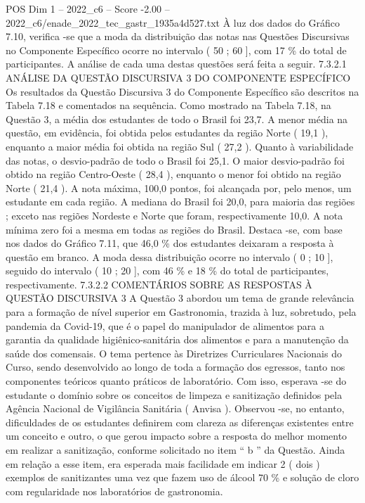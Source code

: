 \begin{textsample}{POS Dim 1 – 2022\_c6 – Score -2.00 – 2022\_c6/enade\_2022\_tec\_gastr\_1935a4d527.txt}
À luz dos dados do Gráfico 7.10, verifica -se que a moda da distribuição das notas nas Questões Discursivas no Componente Específico ocorre no intervalo ( 50 ; 60 ], com 17 \% do total de participantes.
A análise de cada uma destas questões será feita a seguir. 7.3.2.1 ANÁLISE DA QUESTÃO DISCURSIVA 3 DO COMPONENTE ESPECÍFICO Os resultados da Questão Discursiva 3 do Componente Específico são descritos na Tabela 7.18 e comentados na sequência.
Como mostrado na Tabela 7.18, na Questão 3, a média dos estudantes de todo o Brasil foi 23,7.
A menor média na questão, em evidência, foi obtida pelos estudantes da região Norte ( 19,1 ), enquanto a maior média foi obtida na região Sul ( 27,2 ).
Quanto à variabilidade das notas, o desvio-padrão de todo o Brasil foi 25,1.
O maior desvio-padrão foi obtido na região Centro-Oeste ( 28,4 ), enquanto o menor foi obtido na região Norte ( 21,4 ).
A nota máxima, 100,0 pontos, foi alcançada por, pelo menos, um estudante em cada região.
A mediana do Brasil foi 20,0, para maioria das regiões ; exceto nas regiões Nordeste e Norte que foram, respectivamente 10,0.
A nota mínima zero foi a mesma em todas as regiões do Brasil.
Destaca -se, com base nos dados do Gráfico 7.11, que 46,0 \% dos estudantes deixaram a resposta à questão em branco.
A moda dessa distribuição ocorre no intervalo ( 0 ; 10 ], seguido do intervalo ( 10 ; 20 ], com 46 \% e 18 \% do total de participantes, respectivamente. 7.3.2.2 COMENTÁRIOS SOBRE AS RESPOSTAS À QUESTÃO DISCURSIVA 3 A Questão 3 abordou um tema de grande relevância para a formação de nível superior em Gastronomia, trazida à luz, sobretudo, pela pandemia da Covid-19, que é o papel do manipulador de alimentos para a garantia da qualidade higiênico-sanitária dos alimentos e para a manutenção da saúde dos comensais.
O tema pertence às Diretrizes Curriculares Nacionais do Curso, sendo desenvolvido ao longo de toda a formação dos egressos, tanto nos componentes teóricos quanto práticos de laboratório.
Com isso, esperava -se do estudante o domínio sobre os conceitos de limpeza e sanitização definidos pela Agência Nacional de Vigilância Sanitária ( Anvisa ).
Observou -se, no entanto, dificuldades de os estudantes definirem com clareza as diferenças existentes entre um conceito e outro, o que gerou impacto sobre a resposta do melhor momento em realizar a sanitização, conforme solicitado no item “ b ” da Questão.
Ainda em relação a esse item, era esperada mais facilidade em indicar 2 ( dois ) exemplos de sanitizantes uma vez que fazem uso de álcool 70 \% e solução de cloro com regularidade nos laboratórios de gastronomia.

\end{textsample}
